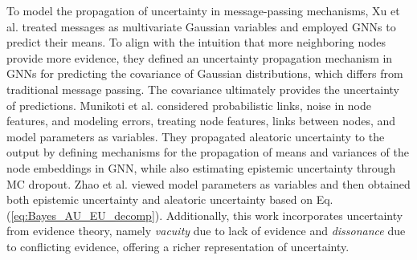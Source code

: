 To model the propagation of uncertainty in message-passing mechanisms, Xu et al. \cite{xu2022uncertainty} treated messages as multivariate Gaussian variables and employed GNNs to predict their means. To align with the intuition that more neighboring nodes provide more evidence, they defined an uncertainty propagation mechanism in GNNs for predicting the covariance of Gaussian distributions, which differs from traditional message passing. The covariance ultimately provides the uncertainty of predictions. 
Munikoti et al. \cite{munikoti2023general} considered probabilistic links, noise in node features, and modeling errors, treating node features, links between nodes, and model parameters as variables. They propagated aleatoric uncertainty to the output by defining mechanisms for the propagation of means and variances of the node embeddings in GNN, while also estimating epistemic uncertainty through MC dropout. 
Zhao et al. \cite{zhao2020uncertainty} viewed model parameters as variables and then obtained both epistemic uncertainty and aleatoric uncertainty based on Eq. (\ref{eq:Bayes_AU_EU_decomp}). 
Additionally, this work incorporates uncertainty from evidence theory, namely \textit{vacuity} due to lack of evidence and \textit{dissonance} due to conflicting evidence, offering a richer representation of uncertainty.


